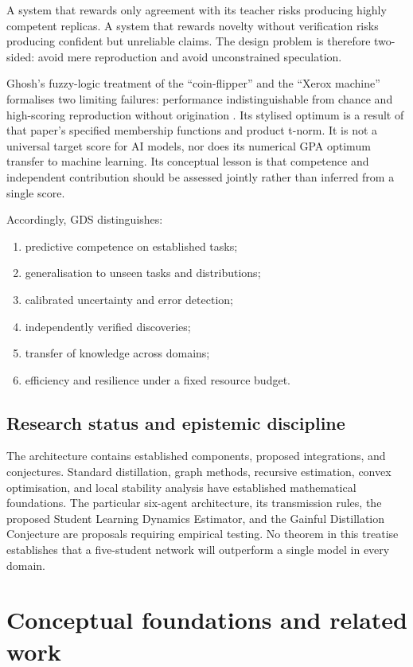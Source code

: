 \documentclass[11pt,a4paper]{article}
\begin{document}
A system that rewards only agreement with its teacher risks producing highly competent replicas. A system that rewards novelty without verification risks producing confident but unreliable claims. The design problem is therefore two-sided: avoid mere reproduction and avoid unconstrained speculation.

Ghosh's fuzzy-logic treatment of the ``coin-flipper'' and the ``Xerox machine'' formalises two limiting failures: performance indistinguishable from chance and high-scoring reproduction without origination \cite{ghosh2026gpa}. Its stylised optimum is a result of that paper's specified membership functions and product t-norm. It is not a universal target score for AI models, nor does its numerical GPA optimum transfer to machine learning. Its conceptual lesson is that competence and independent contribution should be assessed jointly rather than inferred from a single score.

Accordingly, GDS distinguishes:
\begin{enumerate}
\item predictive competence on established tasks;
\item generalisation to unseen tasks and distributions;
\item calibrated uncertainty and error detection;
\item independently verified discoveries;
\item transfer of knowledge across domains;
\item efficiency and resilience under a fixed resource budget.
\end{enumerate}

\subsection{Research status and epistemic discipline}

The architecture contains established components, proposed integrations, and conjectures. Standard distillation, graph methods, recursive estimation, convex optimisation, and local stability analysis have established mathematical foundations. The particular six-agent architecture, its transmission rules, the proposed Student Learning Dynamics Estimator, and the Gainful Distillation Conjecture are proposals requiring empirical testing. No theorem in this treatise establishes that a five-student network will outperform a single model in every domain.

\section{Conceptual foundations and related work}
\end{document}
